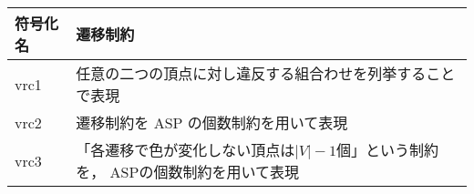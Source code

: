 \begin{tabular}{l|p{8cm}}
  符号化名 & 遷移制約 \\\hline
  vrc1 & 任意の二つの頂点に対し違反する組合わせを列挙することで表現  \\ \hline
  vrc2 & 遷移制約を ASP の個数制約を用いて表現\\\hline
  vrc3 & 「各遷移で色が変化しない頂点は$|V|-1$個」という制約を，
         ASPの個数制約を用いて表現
\end{tabular}